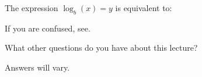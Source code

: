 \documentclass{ximera}
\begin{document}
\begin{question}
  The expression $\log_b(x) = y$ is equivalent to:
  \begin{solution}
    \begin{hint}
      If you are confused, see.
    \end{hint}
    \begin{multiple-choice}
    \end{multiple-choice}  
  \end{solution}
\end{question}


What other questions do you have about this lecture?
\begin{free-response}
Answers will vary.
\end{free-response}
\end{document}
